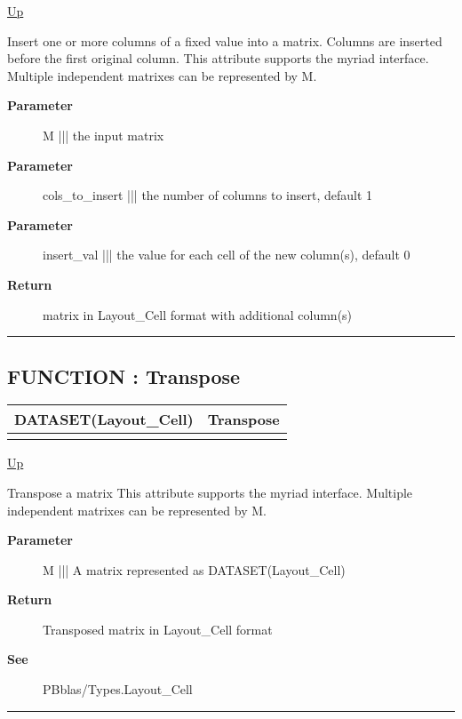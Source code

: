 \hyperlink{ecldoc:PBblas.MatUtils}{Up}

\par
Insert one or more columns of a fixed value into a matrix. Columns are inserted before the first original column. This attribute supports the myriad interface. Multiple independent matrixes can be represented by M.

\par
\begin{description}
\item [\textbf{Parameter}] M ||| the input matrix
\item [\textbf{Parameter}] cols\_to\_insert ||| the number of columns to insert, default 1
\item [\textbf{Parameter}] insert\_val ||| the value for each cell of the new column(s), default 0
\item [\textbf{Return}] matrix in Layout\_Cell format with additional column(s)
\end{description}

\rule{\textwidth}{0.4pt}
\subsection*{FUNCTION : Transpose}
\hypertarget{ecldoc:pbblas.matutils.transpose}{}

{\renewcommand{\arraystretch}{1.5}
\begin{tabularx}{\textwidth}{|>{\raggedright\arraybackslash}l|X|}
\hline
\hspace{0pt}DATASET(Layout\_Cell) & Transpose \\
\hline
\multicolumn{2}{|>{\raggedright\arraybackslash}X|}{\hspace{0pt}(DATASET(Layout\_Cell) M)} \\
\hline
\end{tabularx}
}

\hyperlink{ecldoc:PBblas.MatUtils}{Up}

\par
Transpose a matrix This attribute supports the myriad interface. Multiple independent matrixes can be represented by M.

\par
\begin{description}
\item [\textbf{Parameter}] M ||| A matrix represented as DATASET(Layout\_Cell)
\item [\textbf{Return}] Transposed matrix in Layout\_Cell format
\item [\textbf{See}] PBblas/Types.Layout\_Cell
\end{description}

\rule{\textwidth}{0.4pt}



